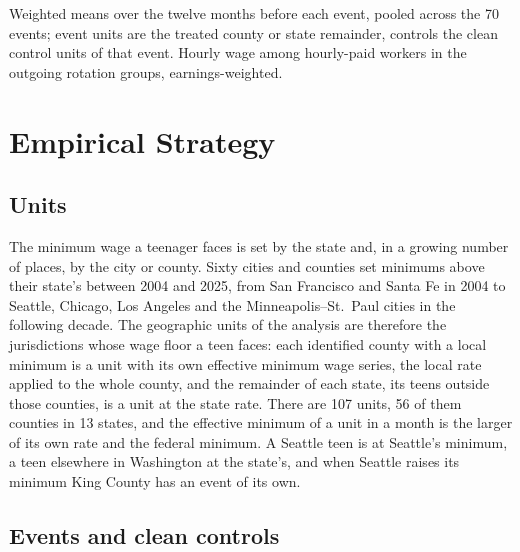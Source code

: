 \documentclass[12pt]{article}
\begin{document}
\begin{table}[H]
\centering
\caption{Means in the year before the event, 70 unit events, 2013--2024: event units and clean controls}
\label{tab:summary}
\small

\begin{tablenotes}\footnotesize
\item Weighted means over the twelve months before each event, pooled across the 70 events; event units are the treated county or state remainder, controls the clean control units of that event. Hourly wage among hourly-paid workers in the outgoing rotation groups, earnings-weighted.
\end{tablenotes}
\end{table}

\section{Empirical Strategy}\label{sec:design}

\subsection{Units}

The minimum wage a teenager faces is set by the state and, in a growing number of places, by the city or county. Sixty cities and counties set minimums above their state's between 2004 and 2025, from San Francisco and Santa Fe in 2004 to Seattle, Chicago, Los Angeles and the Minneapolis--St.\ Paul cities in the following decade. The geographic units of the analysis are therefore the jurisdictions whose wage floor a teen faces: each identified county with a local minimum is a unit with its own effective minimum wage series, the local rate applied to the whole county, and the remainder of each state, its teens outside those counties, is a unit at the state rate. There are 107 units, 56 of them counties in 13 states, and the effective minimum of a unit in a month is the larger of its own rate and the federal minimum. A Seattle teen is at Seattle's minimum, a teen elsewhere in Washington at the state's, and when Seattle raises its minimum King County has an event of its own.

\subsection{Events and clean controls}
\end{document}
